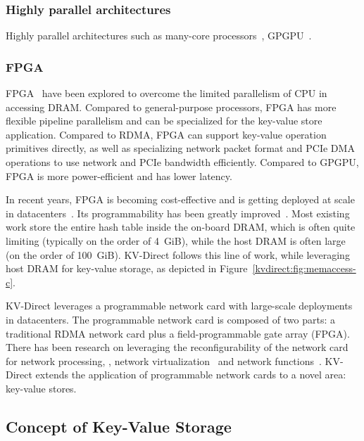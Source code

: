 \subsubsection{Highly parallel architectures}

Highly parallel architectures such as many-core processors~\cite{berezecki2011many}, GPGPU~\cite{zhang2015mega}.

\subsubsection{FPGA}

FPGA~\cite{istvan2013flexible, chalamalasetti2013fpga, maohardware, lavasani2014fpga, istvan2015hash, istvan2016consensus, kvs-openpower, istvan2015hash, sidler2015scalable, blott2015scaling} have been explored to overcome the limited parallelism of CPU in accessing DRAM.
Compared to general-purpose processors, FPGA has more flexible pipeline parallelism and can be specialized for the key-value store application.
Compared to RDMA, FPGA can support key-value operation primitives directly, as well as specializing network packet format and PCIe DMA operations to use network and PCIe bandwidth efficiently.
Compared to GPGPU, FPGA is more power-efficient and has lower latency.

In recent years, FPGA is becoming cost-effective and is getting deployed at scale in datacenters~\cite{putnam2014programmable, caulfield2016cloud}. Its programmability has been greatly improved~\cite{li2016clicknp}.
Most existing work store the entire hash table inside the on-board DRAM, which is often quite limiting (typically on the order of 4~GiB), while the host DRAM is often large (on the order of 100~GiB).
KV-Direct follows this line of work, while leveraging host DRAM for key-value storage, as depicted in Figure~\ref{kvdirect:fig:memaccess-c}.

KV-Direct leverages a programmable network card with large-scale deployments in datacenters.
The programmable network card is composed of two parts: a traditional RDMA network card plus a field-programmable gate array (FPGA).
There has been research on leveraging the reconfigurability of the network card for network processing, \eg, network virtualization~\cite{greenberg2015sdn, vfp} and network functions~\cite{li2016clicknp}.
KV-Direct extends the application of programmable network cards to a novel area: key-value stores.

\subsection{Concept of Key-Value Storage}
\label{kvdirect:sec:kvs}

